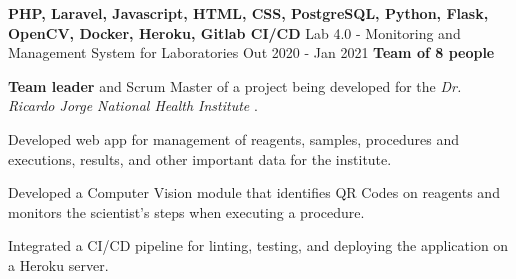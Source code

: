   \cventry
    {\textbf{PHP, Laravel, Javascript, HTML, CSS, PostgreSQL, Python, Flask, OpenCV, Docker, Heroku, Gitlab CI/CD}} %
    {Lab 4.0 - Monitoring and Management System for Laboratories \href{https://laboratorio-4.herokuapp.com/}{\faExternalLink}} %
    {Out 2020 - Jan 2021} %
    {\textbf{Team of 8 people}} %
    {
      \begin{cvitems} %
        \item {\textbf{Team leader} and Scrum Master of a project being developed for the \textit{Dr. Ricardo Jorge National Health Institute} \href{http://www.insa.pt}{\faExternalLink}.}
        \item {Developed web app for management of reagents, samples, procedures and executions, results, and other important data for the institute.}
        \item {Developed a Computer Vision module that identifies QR Codes on reagents and monitors the scientist's steps when executing a procedure.}
        \item {Integrated a CI/CD pipeline for linting, testing, and deploying the application on a Heroku server.}
      \end{cvitems}
    }